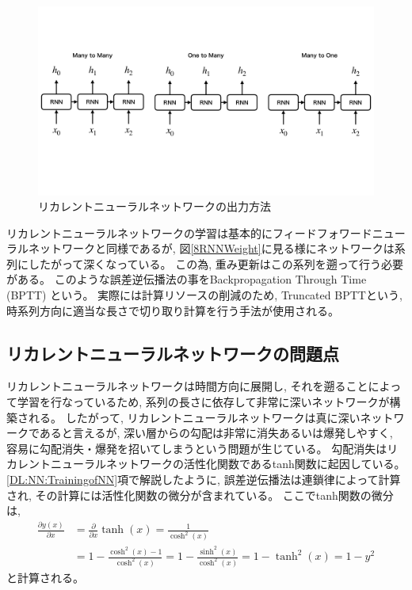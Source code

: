 \begin{figure}[htbp]
 \centering
 \includegraphics[trim = 0 200 0 200, width=1.0\textwidth, clip]{Figure/2DeepLearning/9RNNOutputs.png}
 \caption[リカレントニューラルネットワークの出力方法]{リカレントニューラルネットワークの出力方法}
 \label{9RNNOutputs}
\end{figure}

リカレントニューラルネットワークの学習は基本的にフィードフォワードニューラルネットワークと同様であるが, 図\ref{8RNNWeight}に見る様にネットワークは系列にしたがって深くなっている。
この為, 重み更新はこの系列を遡って行う必要がある。
このような誤差逆伝播法の事をBackpropagation Through Time (BPTT) という。
実際には計算リソースの削減のため, Truncated BPTTという, 時系列方向に適当な長さで切り取り計算を行う手法が使用される。


\subsection{リカレントニューラルネットワークの問題点} \label{DL:RNN:IssueofRNN}

リカレントニューラルネットワークは時間方向に展開し, それを遡ることによって学習を行なっているため, 系列の長さに依存して非常に深いネットワークが構築される。
したがって, リカレントニューラルネットワークは真に深いネットワークであると言えるが, 深い層からの勾配は非常に消失あるいは爆発しやすく, 容易に勾配消失・爆発を招いてしまうという問題が生じている。
勾配消失はリカレントニューラルネットワークの活性化関数であるtanh関数に起因している。
\ref{DL:NN:TrainingofNN}項で解説したように, 誤差逆伝播法は連鎖律によって計算され, その計算には活性化関数の微分が含まれている。
ここでtanh関数の微分は, 
\begin{equation}
 \begin{split}
  \frac{\partial y(x)}{\partial x}
  &= \frac{\partial}{\partial x} \tanh(x) = \frac{1}{\cosh^2 (x)} \\
  &= 1 - \frac{\cosh^2 (x) - 1}{\cosh^2 (x)} = 1 - \frac{\sinh^2 (x)}{\cosh^2 (x)} = 1 - \tanh^2 (x) = 1 - y^2
 \end{split}
\end{equation}
と計算される。

